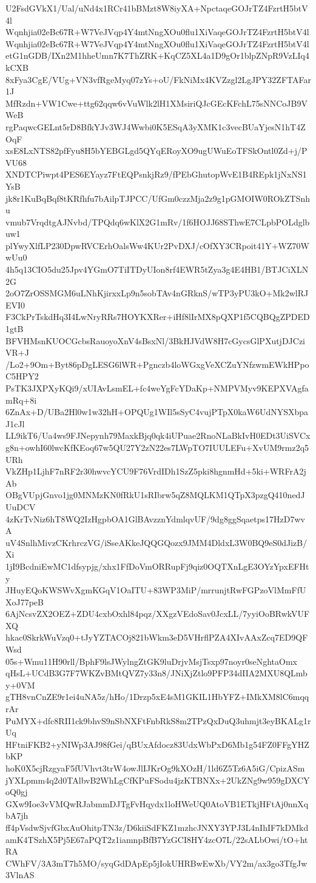 U2FsdGVkX1/Ual/uNd4x1RCr41bBMzt8W8iyXA+NpctaqeGOJrTZ4FzrtH5btV4l
Wqnhjia02eBc67R+W7VeJVqp4Y4mtNngXOu0flu1XiVaqeGOJrTZ4FzrtH5btV4l
Wqnhjia02eBc67R+W7VeJVqp4Y4mtNngXOu0flu1XiVaqeGOJrTZ4FzrtH5btV4l
etG1nGDB/IXn2M1hheUmn7K7ThZRK+KqCZ5XL4a1D9gOr1blpZNpR9VzLIq4kCXB
8xFya3CgE/VUg+VN3vfRgeMyq07zYs+oU/FkNiMx4KVZzgl2LgJPY32ZFTAFar1J
MfRzdn+VW1Cwe+ttg62qqw6vVuWlk2lH1XMsiriQJcGEcKFchL75sNNCoJB9VWeB
rgPaqwcGELnt5rD8BfkYJv3WJ4Wwbi0K5ESqA3yXMK1c3vecBUaYjesN1hT4ZOqF
xsE8LxNTS82pfFyu8H5bYEBGLgd5QYqERoyXO9ugUWuEoTFSkOntl0Zd+j/PVU68
XNDTCPiwpt4PES6EYayz7FtEQPsnkjRz9/fPEbGhutopWvE1B4REpk1jNxNS1YsB
jk8r1KuBqBqf8tKRfhfu7bAilpTJPCC/UfGm0czzMja2z9g1pGMOIW0ROkZTSnhu
vmub7VrqdtgAJNvbd/TPQdq6wKlX2G1mRv/1f6HOJJ68SThwE7CLpbPOLdglbuw1
plYwyXlfLP230DpwRVCErhOalsWw4KUr2PvDXJ/cOfXY3CRpoit41Y+WZ70WwUu0
4h5q13CIO5du25Jpv4YGmO7TiITDyUIon8rf4EWR5tZya3g4E4HB1/BTJCiXLN2G
2oO7ZrOSSMGM6uLNhKjirxxLp9n5sobTAv4nGRknS/wTP3yPU3kO+Mk2wlRJEVI0
F3CkPrTskdHq3I4LwNryRRs7HOYKXRer+iHf8lIrMX8pQXP1f5CQBQgZPDED1gtB
BFVHMsnKUOCGcbsRauoyoXnV4sBsxNl/3BkHJVdW8H7cGycsGlPXutjDJCziVR+J
/Lo2+9Om+Byt86pDgLESG6lWR+Pgnczb4loWGxgVeXCZuYNfzwmEWkHPpoC5HPY2
PsTK3JXPXyKQi9/xUIAvLsmEL+fc4weYgFcYDaKp+NMPVMyv9KEPXVAgfamRq+8i
6ZnAx+D/UBa2Hl0w1w32hH+OPQUg1WIl5sSyC4vujPTpX0kaW6UdNYSXbpaJ1cJl
LL9ikT6/Ua4ws9FJNepynh79MaxkBjq0qk4iUPuae2RnoNLaBkIvH0EDt3UiSVCx
g8n+owhI60lwcKfKEoq67w5QU27Y2zN22es7LWpTO7IUULEFu+XvUM9rmz2q5URh
VkZHp1LjhF7nRF2r30hwvcYCU9F76VrdIDh1SzZ5pki8hgnmHd+5ki+WRFrA2jAb
OBgVUpjGnvo1jg0MNMzKN0fRkU1sRIbrw5qZ8MQLKM1QTpX3pzgQ410nedJUuDCV
4zKrTvNiz6hT8WQ2IzHgpbOA1GlBAvzznYdmlqvUF/9dg8ggSqaetps17HzD7wvA
uV4SnlhMivzCKrhrczVG/iSseAKkeJQQGQozx9JMM4DldxL3W0BQ9eS0dJizB/Xi
1jI9BcdniEwMC1dfsypjg/xhx1FfDoVmORRupFj9qiz0OQTXnLgE3OYzYpxEFHty
JHuyEQoKWSWvXgmKGqV1OaITU+83WP3MiP/mrrunjtRwFGPzoVlMmFfUXoJ77peB
6AjNcsvZX2OEZ+ZDU4cxbOxhl84pqz/XXgzVEdoSav0JcxLL/7yyiOoBRwkVUFXQ
hkac0SkrkWuVzq0+tJyYZTACOj821bWkm3eD5VHrflPZA4XIvAAxZcq7ED9QFWsd
05s+Wmu11H90rll/BphF9lsJWylngZtGK9luDrjvMsjTsxp97noyr0seNghtaOmx
qHsL+UCdB3G7F7WKZvBMtQVZ7y33n8/JNiXjZtlo9PFP34dIIA2MXU8QLmby+0VM
gTH8vnCnZE9r1ei4uNA5z/hHo/1Drzp5xE4sM1GKIL1HbYFZ+IMkXM8lC6mqqrAr
PuMYX+dfc8RII1ck9bhvS9nSbNXFtFnbRkS8m2TPzQxDuQ3uhmjt3eyBKALg1rUq
HFtniFKB2+yNIWp3AJ98fGei/qBUxAfdocz83UdxWbPxD6Mb1g54FZ0FFgYHZbKP
hoK0X5cjRzgyaF5fUVhvt3trW4owJlIJKrOg9kXOzH/1ld6Z5Tz6A5iG/CpizASm
jYXLpmm4q2d0TAlbvB2WhLgCfKPuFSodu4jzKTBNXx+2UkZNg9w959gDXCYoQ0gj
GXw9Ioe3vVMQwRJabmmDJTgFvHqydx1loHWeUQ0AtoVB1ETkjHFtAj0nnXqbA7jh
ff4pVsdwSjvfGbxAuOhitpTN3z/D6kiiSdFKZ1mzhcJNXY3YPJ3L4nIhIF7kDMkd
amK4TSzhX5Pj5E67aPQT2z1iamnpBfB7YzGCI8HY4zcO7L/22sALbOwi/tO+htRA
CWhFV/3A3mT7h5MO/syqGdDApEp5jIokUHRBwEwXb/VY2m/ax3go3TfgJw3VlnAS

